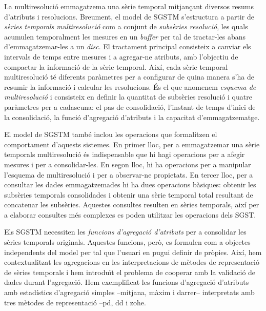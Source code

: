 La multiresolució emmagatzema una sèrie temporal mitjançant diversos
resums d'atributs i resolucions.  Breument, el model de \gls{SGSTM}
s'estructura a partir de \emph{sèries temporals multiresolució} com a
conjunt de \emph{subsèries resolució}, les quals acumulen temporalment
les mesures en un \emph{buffer} per tal de tractar-les abans
d'emmagatzemar-les a un \emph{disc}. El tractament principal
consisteix a canviar els intervals de temps entre mesures i a
agregar-ne atributs, amb l'objectiu de compactar la informació de la
sèrie temporal.  Així, cada sèrie temporal multiresolució té diferents
paràmetres per a configurar de quina manera s'ha de resumir la
informació i calcular les resolucions. És el que anomenem
\emph{esquema de multiresolució} i consisteix en definir la quantitat
de subsèries resolució i quatre paràmetres per a cadascuna: el pas de
consolidació, l'instant de temps d'inici de la consolidació, la funció
d'agregació d'atributs i la capacitat d'emmagatzematge.



El model de \gls{SGSTM} també inclou les operacions que formalitzen el
comportament d'aquests sistemes. En primer lloc, per a emmagatzemar
una sèrie temporals multiresolució és indispensable que hi hagi
operacions per a afegir mesures i per a consolidar-les. En segon lloc,
hi ha operacions per a manipular l'esquema de multiresolució i per a
observar-ne propietats. En tercer lloc, per a consultar les dades
emmagatzemades hi ha dues operacions bàsiques: obtenir les subsèries
temporals consolidades i obtenir una sèrie temporal total resultant de
concatenar les subsèries. Aquestes consultes resulten en sèries
temporals, així per a elaborar consultes més complexes es poden
utilitzar les operacions dels \gls{SGST}.



Els \gls{SGSTM} necessiten les \emph{funcions d'agregació d'atributs}
per a consolidar les sèries temporals originals.  Aquestes funcions,
però, es formulen com a objectes independents del model per tal que
l'usuari en pugui definir de pròpies.  Així, hem contextualitzat les
agregacions en les interpretacions de mètodes de representació de
sèries temporals i hem introduït el problema de cooperar amb la
validació de dades durant l'agregació.  Hem exemplificat les funcions
d'agregació d'atributs amb estadístics d'agregació simples --mitjana,
màxim i darrer-- interpretats amb tres mètodes de representació
--\gls{pd}, \gls{dd} i \gls{zohe}.




